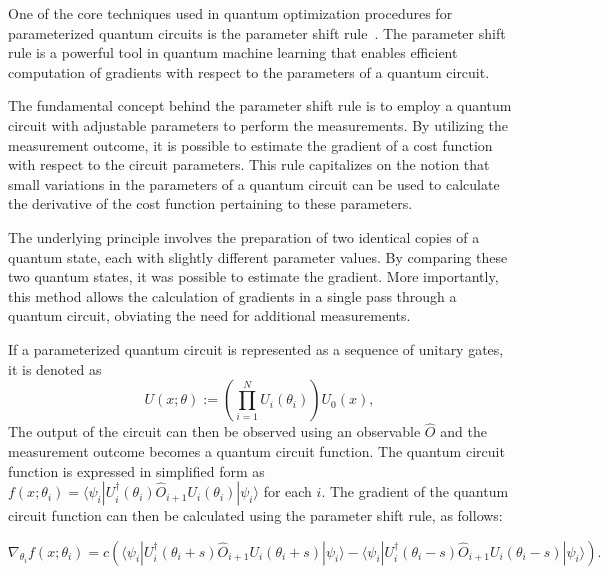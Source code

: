 \documentclass[aps,groupedaddress,superscriptaddress,amssymb,amsmath,amsbsy,amsfonts,twocolumn,pra]{revtex4}
\begin{document}
One of the core techniques used in quantum optimization procedures for parameterized quantum circuits is the parameter shift rule~\cite{MNKF18}. The parameter shift rule is a powerful tool in quantum machine learning that enables efficient computation of gradients with respect to the parameters of a quantum circuit. 

The fundamental concept behind the parameter shift rule is to employ a quantum circuit with adjustable parameters to perform the measurements. By utilizing the measurement outcome, it is possible to estimate the gradient of a cost function with respect to the circuit parameters. This rule capitalizes on the notion that small variations in the parameters of a quantum circuit can be used to calculate the derivative of the cost function pertaining to these parameters.

The underlying principle involves the preparation of two identical copies of a quantum state, each with slightly different parameter values. By comparing these two quantum states, it was possible to estimate the gradient. More importantly, this method allows the calculation of gradients in a single pass through a quantum circuit, obviating the need for additional measurements.

If a parameterized quantum circuit is represented as a sequence of unitary gates, it is denoted as 
\begin{equation*}
U(x;\theta):= \left(\prod_{i=1}^{N} U_i(\theta_i)\right) U_0(x),
\end{equation*}
The output of the circuit can then be observed using an observable $\hat{O}$ and the measurement outcome becomes a quantum circuit function. The quantum circuit function is expressed in simplified form as $f(x;\theta_i) = \langle\psi_i| U_i^\dagger(\theta_i) \hat{O}_{i+1} U_i(\theta_i) |\psi_i\rangle$ for each $i$. The gradient of the quantum circuit function can then be calculated using the parameter shift rule, as follows:

\begin{widetext}
\begin{equation} \label{eq:psr}
\nabla_{\theta_i} f(x;\theta_i) = c \left(\langle\psi_i| U_i^\dagger(\theta_i+s) \hat{O}_{i+1} U_i(\theta_i+s) |\psi_i\rangle - \langle\psi_i| U_i^\dagger(\theta_i-s) \hat{O}_{i+1} U_i(\theta_i-s) |\psi_i\rangle\right).
\end{equation}
\end{widetext}
\end{document}
